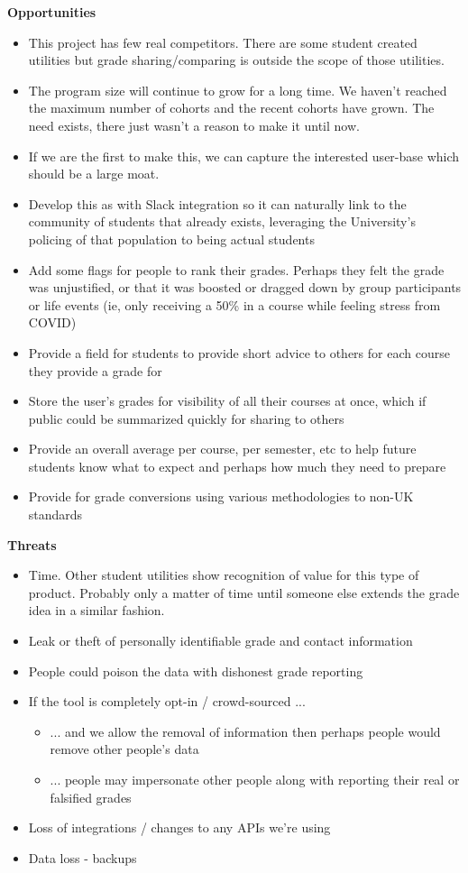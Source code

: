 \documentclass{article}
\begin{document}
\textbf{Opportunities}
\begin{itemize}
    \item This project has few real competitors. There are some student created utilities but grade sharing/comparing is outside the scope of those utilities.
    \item The program size will continue to grow for a long time. We haven't reached the maximum number of cohorts and the recent cohorts have grown. The need exists, there just wasn't a reason to make it until now.
    \item If we are the first to make this, we can capture the interested user-base which should be a large moat.
    \item Develop this as with Slack integration so it can naturally link to the community of students that already exists, leveraging the University's policing of that population to being actual students
    \item Add some flags for people to rank their grades. Perhaps they felt the grade was unjustified, or that it was boosted or dragged down by group participants or life events (ie, only receiving a 50\% in a course while feeling stress from COVID)
    \item Provide a field for students to provide short advice to others for each course they provide a grade for
    \item Store the user's grades for visibility of all their courses at once, which if public could be summarized quickly for sharing to others
    \item Provide an overall average per course, per semester, etc to help future students know what to expect and perhaps how much they need to prepare
    \item Provide for grade conversions using various methodologies to non-UK standards
\end{itemize}
\textbf{Threats}
\begin{itemize}
    \item Time. Other student utilities show recognition of value for this type of product. Probably only a matter of time until someone else extends the grade idea in a similar fashion.
    \item Leak or theft of personally identifiable grade and contact information
    \item People could poison the data with dishonest grade reporting
    \item If the tool is completely opt-in / crowd-sourced ...
    \begin{itemize}
        \item ... and we allow the removal of information then perhaps people would remove other people's data
    \end{itemize}
    \begin{itemize}
        \item ... people may impersonate other people along with reporting their real or falsified grades
    \end{itemize}
    \item Loss of integrations / changes to any APIs we're using
    \item Data loss - backups
\end{itemize}
\end{document}
